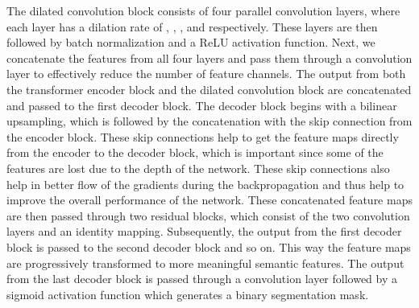\documentclass[conference]{IEEEtran}
\begin{document}
The dilated convolution block consists of four parallel  convolution layers, where each layer has a dilation rate of , , , and  respectively.  These layers are then followed by batch normalization and a ReLU activation function. Next, we concatenate the features from all four layers and pass them through a  convolution layer to effectively reduce the number of feature channels. The output from both the transformer encoder block and the dilated convolution block are concatenated and passed to the first decoder block. The decoder block begins with a bilinear upsampling, which is followed by the concatenation with the skip connection from the encoder block. These skip connections help to get the feature maps directly from the encoder to the decoder block, which is important since some of the features are lost due to the depth of the network. These skip connections also help in better flow of the gradients during the backpropagation and thus help to improve the overall performance of the network. These concatenated feature maps are then passed through two residual blocks, which consist of the two  convolution layers and an identity mapping. Subsequently, the output from the first decoder block is passed to the second decoder block and so on. This way the feature maps are progressively transformed to more meaningful semantic features. The output from the last decoder block is passed through a  convolution layer followed by a sigmoid activation function which generates a binary segmentation mask.
\end{document}
